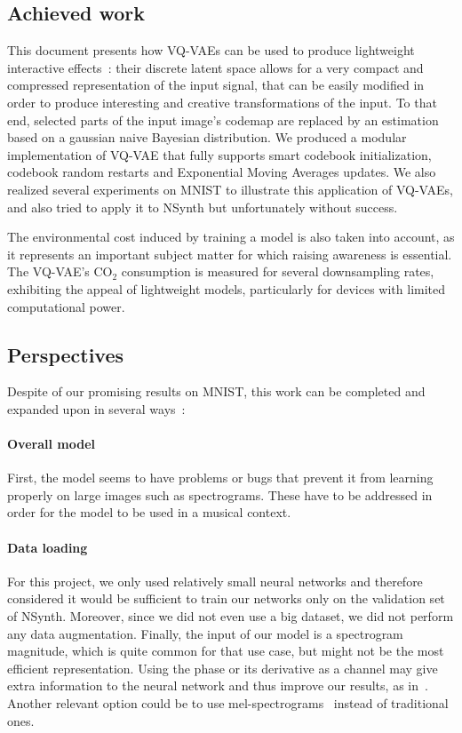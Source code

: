 \documentclass{article}
\begin{document}
\subsection{Achieved work}

This document presents how VQ-VAEs can be used to produce lightweight interactive effects~: their discrete latent space allows for a very compact and compressed representation of the input signal, that can be easily modified in order to produce interesting and creative transformations of the input. To that end, selected parts of the input image's codemap are replaced by an estimation based on a gaussian naive Bayesian distribution. We produced a modular implementation of VQ-VAE that fully supports smart codebook initialization, codebook random restarts and Exponential Moving Averages updates. We also realized several experiments on MNIST to illustrate this application of VQ-VAEs, and also tried to apply it to NSynth but unfortunately without success.

The environmental cost induced by training a model is also taken into account, as it represents an important subject matter for which raising awareness is essential. The VQ-VAE's CO$_2$ consumption is measured for several downsampling rates, exhibiting the appeal of lightweight models, particularly for devices with limited computational power.

\subsection{Perspectives}

Despite of our promising results on MNIST, this work can be completed and expanded upon in several ways~:

\paragraph*{Overall model} First, the model seems to have problems or bugs that prevent it from learning properly on large images such as spectrograms. These have to be addressed in order for the model to be used in a musical context.

\paragraph*{Data loading} For this project, we only used relatively small neural networks and therefore considered it would be sufficient to train our networks only on the validation set of NSynth. Moreover, since we did not even use a big dataset, we did not perform any data augmentation. Finally, the input of our model is a spectrogram magnitude, which is quite common for that use case, but might not be the most efficient representation. Using the phase or its derivative as a channel may give extra information to the neural network and thus improve our results, as in~\cite{PhaseFeatures}. Another relevant option could be to use mel-spectrograms~\cite{MelSpectrogram} instead of traditional ones.
\end{document}
